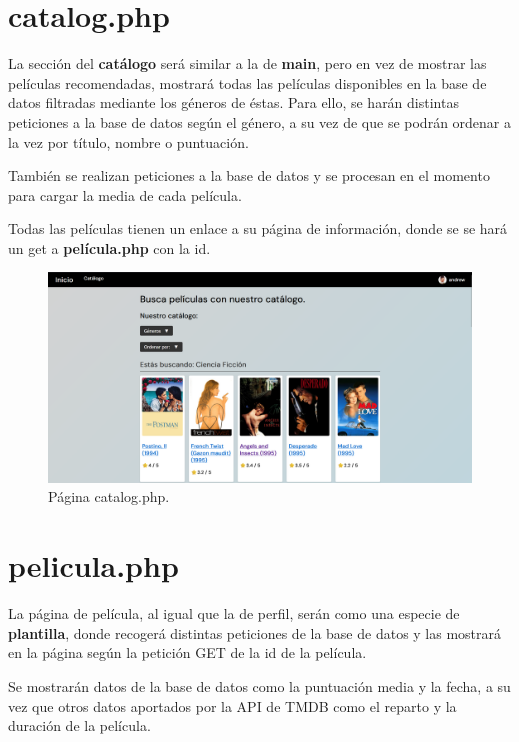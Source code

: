 \documentclass[a4paper, 12pt]{report}
\begin{document}
    \section{catalog.php}

    La sección del \textbf{catálogo} será similar a la de \textbf{main}, pero en vez de mostrar las películas recomendadas, mostrará todas las películas disponibles en la base de datos filtradas mediante los géneros de éstas. Para ello, se harán distintas peticiones a la base de datos según el género, a su vez de que se podrán ordenar a la vez por título, nombre o puntuación.

    También se realizan peticiones a la base de datos y se procesan en el momento para cargar la media de cada película.

    Todas las películas tienen un enlace a su página de información, donde se se hará un get a \textbf{película.php} con la id.

    \begin{figure}[H]
        \centering
        \includegraphics[scale=0.20]{resources/img/catalog.png}
        \caption{Página catalog.php.}
        \label{fig:catalog}
    \end{figure}

    \section{pelicula.php}

    La página de película, al igual que la de perfil, serán como una especie de \textbf{plantilla}, donde recogerá distintas peticiones de la base de datos y las mostrará en la página según la petición GET de la id de la película.

   Se mostrarán datos de la base de datos como la puntuación media y la fecha, a su vez que otros datos aportados por la API de TMDB como el reparto y la duración de la película.
\end{document}
